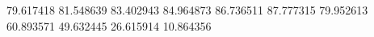 79.617418
81.548639
83.402943
84.964873
86.736511
87.777315
79.952613
60.893571
49.632445
26.615914
10.864356
